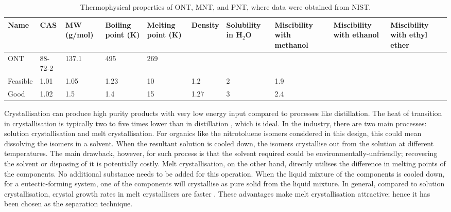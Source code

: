 \begin{table}[h]
\centering
\caption{Thermophysical properties of ONT, MNT, and PNT, where data were obtained from NIST.}
\begin{tabular}{llllllllll}
\toprule
Name  & CAS & MW (g/mol) & Boiling point (K) & Melting point (K)   & Density & Solubility in H$_2$O & Miscibility with methanol & Miscibility with ethanol & Miscibility with ethyl ether \\ \midrule
ONT &    88-72-2    &  137.1  & 495 & 269 &            &        &    &      & \\
Feasible   & 1.01         & 1.05         & 1.23  & 10      & 1.2                    & 2               & 1.9             \\
Good       & 1.02         & 1.5          & 1.4   & 15      & 1.27                   & 3               & 2.4             \\ \bottomrule
\end{tabular}
\label{tab:propoerties of P,M,O NTs}
\end{table}


Crystallisation can produce high purity products with very low energy input compared to processes like distillation. The heat of transition in crystallisation is typically two to five times lower than in distillation \cite{noauthor_melt_nodate}, which is ideal. In the industry, there are two main processes: solution crystallisation and melt crystallisation. For organics like the nitrotoluene isomers considered in this design, this could mean dissolving the isomers in a solvent. When the resultant solution is cooled down, the isomers crystallise out from the solution at different temperatures. The main drawback, however, for such process is that the solvent required could be environmentally-unfriendly; recovering the solvent or disposing of it is potentially costly. Melt crystallisation, on the other hand, directly utilises the difference in melting points of the components. No additional substance needs to be added for this operation. When the liquid mixture of the components is cooled down, for a eutectic-forming system, one of the components will crystallise as pure solid from the liquid mixture. In general, compared to solution crystallisation, crystal growth rates in melt crystallisers are faster \cite{myerson_handbook_2019}. These advantages make melt crystallisation attractive; hence it has been chosen as the separation technique. 


